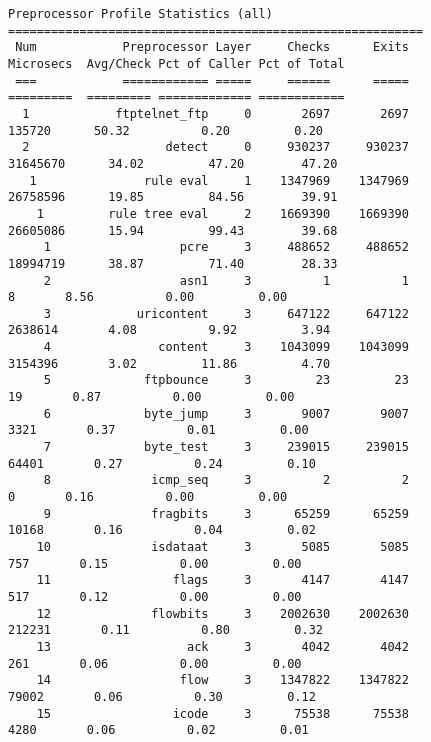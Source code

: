 \documentclass[english]{report}
\begin{document}
\begin{figure}
\footnotesize{
\begin{verbatim}
Preprocessor Profile Statistics (all)
==========================================================
 Num            Preprocessor Layer     Checks      Exits           Microsecs  Avg/Check Pct of Caller Pct of Total
 ===            ============ =====     ======      =====           =========  ========= ============= ============
  1            ftptelnet_ftp     0       2697       2697              135720      50.32          0.20         0.20
  2                   detect     0     930237     930237            31645670      34.02         47.20        47.20
   1               rule eval     1    1347969    1347969            26758596      19.85         84.56        39.91
    1         rule tree eval     2    1669390    1669390            26605086      15.94         99.43        39.68
     1                  pcre     3     488652     488652            18994719      38.87         71.40        28.33
     2                  asn1     3          1          1                   8       8.56          0.00         0.00
     3            uricontent     3     647122     647122             2638614       4.08          9.92         3.94
     4               content     3    1043099    1043099             3154396       3.02         11.86         4.70
     5             ftpbounce     3         23         23                  19       0.87          0.00         0.00
     6             byte_jump     3       9007       9007                3321       0.37          0.01         0.00
     7             byte_test     3     239015     239015               64401       0.27          0.24         0.10
     8              icmp_seq     3          2          2                   0       0.16          0.00         0.00
     9              fragbits     3      65259      65259               10168       0.16          0.04         0.02
    10              isdataat     3       5085       5085                 757       0.15          0.00         0.00
    11                 flags     3       4147       4147                 517       0.12          0.00         0.00
    12              flowbits     3    2002630    2002630              212231       0.11          0.80         0.32
    13                   ack     3       4042       4042                 261       0.06          0.00         0.00
    14                  flow     3    1347822    1347822               79002       0.06          0.30         0.12
    15                 icode     3      75538      75538                4280       0.06          0.02         0.01

\end{verbatim}}
\end{figure}
\end{document}
